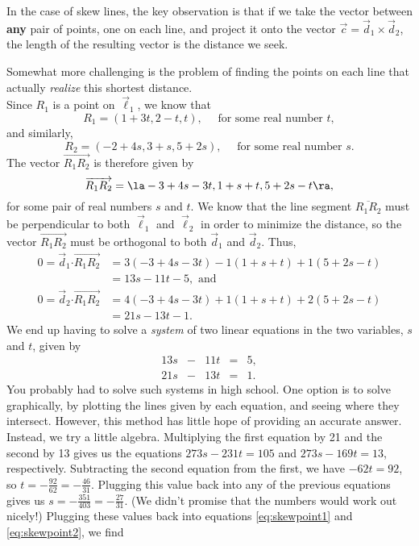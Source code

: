 In the case of skew lines, the key observation is that if we take the vector between \textbf{any} pair of points, one on each line, and project it onto the vector $\vec c = \vec{d}_1\times\vec{d}_2$, the length of the resulting vector is the distance we seek.

Somewhat more challenging is the problem of finding the points on each line that actually \textit{realize} this shortest distance.\\

{Since $R_1$ is a point on $\vec\ell_1$, we know that 
\begin{equation}\label{eq:skewpoint1}
R_1 = (1+3t, 2-t, t), \quad \text{ for some real number } t,
\end{equation}
and similarly, 
\begin{equation}\label{eq:skewpoint2}
R_2 = (-2+4s, 3+s, 5+2s), \quad \text{ for some real number } s.
\end{equation}
The vector $\overrightarrow{R_1R_2}$ is therefore given by
\[
\overrightarrow{R_1R_2}=\la -3+4s-3t, 1+s+t, 5+2s-t\ra,
\]
for some pair of real numbers $s$ and $t$. We know that the line segment $\overline{R_1R_2}$ must be perpendicular to both $\vec\ell_1$ and $\vec\ell_2$ in order to minimize the distance, so the vector $\overrightarrow{R_1R_2}$ must be orthogonal to both $\vec{d}_1$ and $\vec{d}_2$. Thus,
\begin{align*}
0 = \vec{d}_1\boldsymbol{\cdot}\overrightarrow{R_1R_2} & = 3(-3+4s-3t)-1(1+s+t)+1(5+2s-t)\\
 &=13s-11t-5, \text{ and}\\
0 = \vec{d}_2\boldsymbol{\cdot}\overrightarrow{R_1R_2} & = 4(-3+4s-3t)+1(1+s+t)+2(5+2s-t)\\
& = 21s-13t-1.
\end{align*}
We end up having to solve a \textit{system} of two linear equations in the two variables, $s$ and $t$, given by
\[
\begin{array}{ccccc}
13s&-&11t&=&5,\\
21s&-&13t&=&1.
\end{array}
\]
You probably had to solve such systems in high school. One option is to solve graphically, by plotting the lines given by each equation, and seeing where they intersect. However, this method has little hope of providing an accurate answer. Instead, we try a little algebra. Multiplying the first equation by 21 and the second by 13 gives us the equations $273s-231t=105$ and $273s-169t=13$, respectively. Subtracting the second equation from the first, we have $-62t = 92$, so $t=-\frac{92}{62}=-\frac{46}{31}$. Plugging this value back into any of the previous equations gives us $s=-\frac{351}{403}=-\frac{27}{31}$. (We didn't promise that the numbers would work out nicely!) Plugging these values back into equations \eqref{eq:skewpoint1} and \eqref{eq:skewpoint2}, we find
}
